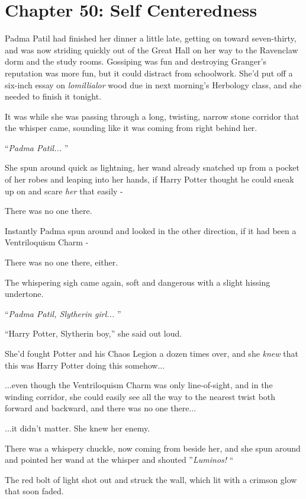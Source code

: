 \chapter{Chapter 50: Self Centeredness}
Padma Patil had finished her dinner a little late, getting on toward
seven-thirty, and was now striding quickly out of the Great Hall on her
way to the Ravenclaw dorm and the study rooms. Gossiping was fun and
destroying Granger's reputation was more fun, but it could distract from
schoolwork. She'd put off a six-inch essay on \emph{lomillialor} wood
due in next morning's Herbology class, and she needed to finish it
tonight.

It was while she was passing through a long, twisting, narrow stone
corridor that the whisper came, sounding like it was coming from right
behind her.

``\emph{Padma Patil...} ''

She spun around quick as lightning, her wand already snatched up from a
pocket of her robes and leaping into her hands, if Harry Potter thought
he could sneak up on and scare \emph{her} that easily -

There was no one there.

Instantly Padma spun around and looked in the other direction, if it had
been a Ventriloquism Charm -

There was no one there, either.

The whispering sigh came again, soft and dangerous with a slight hissing
undertone.

``\emph{Padma Patil, Slytherin girl...} ''

``Harry Potter, Slytherin boy,'' she said out loud.

She'd fought Potter and his Chaos Legion a dozen times over, and she
\emph{knew} that this was Harry Potter doing this somehow...

...even though the Ventriloquism Charm was only line-of-sight, and
in the winding corridor, she could easily see all the way to the nearest
twist both forward and backward, and there was no one there...

...it didn't matter. She knew her enemy.

There was a whispery chuckle, now coming from beside her, and she spun
around and pointed her wand at the whisper and shouted ''\emph{Luminos!}
``

The red bolt of light shot out and struck the wall, which lit with a
crimson glow that soon faded.

